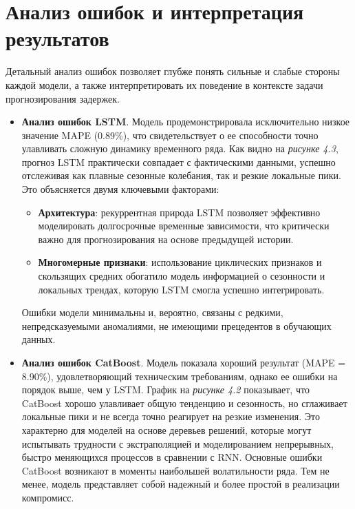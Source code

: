 \section{Анализ ошибок и интерпретация результатов}
\label{sec:error_analysis}

\hspace*{1.25cm}Детальный анализ ошибок позволяет глубже понять сильные и слабые стороны каждой модели, а также интерпретировать их поведение в контексте задачи прогнозирования задержек.

\begin{itemize}
    \item \textbf{Анализ ошибок LSTM}. Модель продемонстрировала исключительно низкое значение MAPE (0.89\%), что свидетельствует о ее способности точно улавливать сложную динамику временного ряда. Как видно на \textit{рисунке 4.3}, прогноз LSTM практически совпадает с фактическими данными, успешно отслеживая как плавные сезонные колебания, так и резкие локальные пики. Это объясняется двумя ключевыми факторами:
    \begin{itemize}
        \item \textbf{Архитектура}: рекуррентная природа LSTM позволяет эффективно моделировать долгосрочные временные зависимости, что критически важно для прогнозирования на основе предыдущей истории.
        \item \textbf{Многомерные признаки}: использование циклических признаков и скользящих средних обогатило модель информацией о сезонности и локальных трендах, которую LSTM смогла успешно интегрировать.
    \end{itemize}
    Ошибки модели минимальны и, вероятно, связаны с редкими, непредсказуемыми аномалиями, не имеющими прецедентов в обучающих данных.

    \item \textbf{Анализ ошибок CatBoost}. Модель показала хороший результат (MAPE = 8.90\%), удовлетворяющий техническим требованиям, однако ее ошибки на порядок выше, чем у LSTM. График на \textit{рисунке 4.2} показывает, что CatBoost хорошо улавливает общую тенденцию и сезонность, но сглаживает локальные пики и не всегда точно реагирует на резкие изменения. Это характерно для моделей на основе деревьев решений, которые могут испытывать трудности с экстраполяцией и моделированием непрерывных, быстро меняющихся процессов в сравнении с RNN. Основные ошибки CatBoost возникают в моменты наибольшей волатильности ряда. Тем не менее, модель представляет собой надежный и более простой в реализации компромисс.


\end{itemize}
